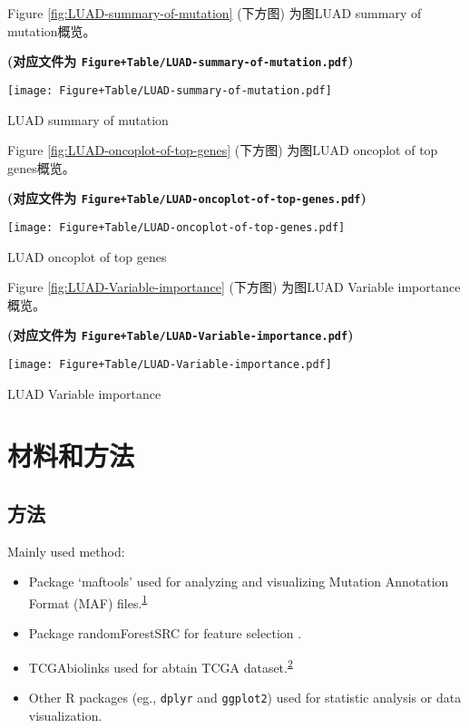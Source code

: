 \documentclass[
]{article}
\providecommand{\tightlist}{%
  \setlength{\itemsep}{0pt}\setlength{\parskip}{0pt}}
\begin{document}
Figure \ref{fig:LUAD-summary-of-mutation} (下方图) 为图LUAD summary of mutation概览。

\textbf{(对应文件为 \texttt{Figure+Table/LUAD-summary-of-mutation.pdf})}

\def\@captype{figure}
\begin{center}
\texttt{[image: Figure+Table/LUAD-summary-of-mutation.pdf]}
\caption{LUAD summary of mutation}\label{fig:LUAD-summary-of-mutation}
\end{center}

Figure \ref{fig:LUAD-oncoplot-of-top-genes} (下方图) 为图LUAD oncoplot of top genes概览。

\textbf{(对应文件为 \texttt{Figure+Table/LUAD-oncoplot-of-top-genes.pdf})}

\def\@captype{figure}
\begin{center}
\texttt{[image: Figure+Table/LUAD-oncoplot-of-top-genes.pdf]}
\caption{LUAD oncoplot of top genes}\label{fig:LUAD-oncoplot-of-top-genes}
\end{center}

Figure \ref{fig:LUAD-Variable-importance} (下方图) 为图LUAD Variable importance概览。

\textbf{(对应文件为 \texttt{Figure+Table/LUAD-Variable-importance.pdf})}

\def\@captype{figure}
\begin{center}
\texttt{[image: Figure+Table/LUAD-Variable-importance.pdf]}
\caption{LUAD Variable importance}\label{fig:LUAD-Variable-importance}
\end{center}

\hypertarget{methods}{%
\section{材料和方法}\label{methods}}

\hypertarget{ux65b9ux6cd5}{%
\subsection{方法}\label{ux65b9ux6cd5}}

Mainly used method:

\begin{itemize}
\tightlist
\item
  Package `maftools' used for analyzing and visualizing Mutation Annotation Format (MAF) files.\textsuperscript{\protect\hyperlink{ref-MaftoolsEfficMayako2018}{1}}
\item
  Package randomForestSRC for feature selection .
\item
  TCGAbiolinks used for abtain TCGA dataset.\textsuperscript{\protect\hyperlink{ref-TcgabiolinksAColapr2015}{2}}
\item
  Other R packages (eg., \texttt{dplyr} and \texttt{ggplot2}) used for statistic analysis or data visualization.
\end{itemize}
\end{document}
